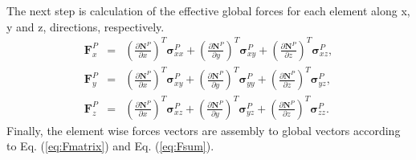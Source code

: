 The next step is calculation of the effective global forces for each element along x, y and z, directions, respectively.
\begin{eqnarray}
	\label{eq:force_3d}
	\textbf{F}^P_{x} &=& 
	\left( \frac{\partial \textbf{N}^P}{\partial x}\right)^T \boldsymbol{\sigma}^P_{xx} +
	\left( \frac{\partial \textbf{N}^P}{\partial y}\right)^T \boldsymbol{\sigma}^P_{xy} +
	\left( \frac{\partial \textbf{N}^P}{\partial z}\right)^T \boldsymbol{\sigma}^P_{xz},\\
	\textbf{F}^P_{y} &=&  
	\left( \frac{\partial \textbf{N}^P}{\partial x}\right)^T \boldsymbol{\sigma}^P_{xy} +
	\left( \frac{\partial \textbf{N}^P}{\partial y}\right)^T \boldsymbol{\sigma}^P_{yy} +
	\left( \frac{\partial \textbf{N}^P}{\partial z}\right)^T \boldsymbol{\sigma}^P_{yz},\\
	\textbf{F}^P_{z} &=&  
	\left( \frac{\partial \textbf{N}^P}{\partial x}\right)^T \boldsymbol{\sigma}^P_{xz} +
	\left( \frac{\partial \textbf{N}^P}{\partial y}\right)^T \boldsymbol{\sigma}^P_{yz} +
	\left( \frac{\partial \textbf{N}^P}{\partial z}\right)^T \boldsymbol{\sigma}^P_{zz}.
\end{eqnarray}
Finally, the element wise forces vectors are assembly to global vectors according to Eq. (\ref{eq:Fmatrix}) and Eq. (\ref{eq:Fsum}).

